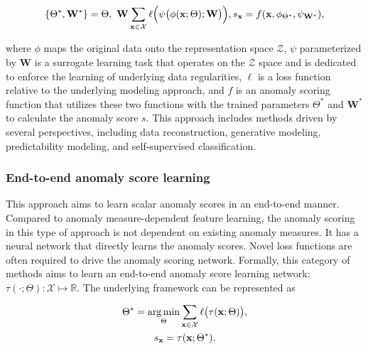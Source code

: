 \begin{equation}
\{\Theta^*, \mathbf{W}^*\} = {\Theta,\ \mathbf{W}} \sum_{\xvec \in \mathcal{X}}\ell\Big(\psi\big(\phi(\mathbf{x};\Theta);\mathbf{W}\big)\Big),
s_{\mathbf{x}} = f(\mathbf{x}, \phi_{\Theta^*}, \psi_{\mathbf{W}^*}) \label{eqn:genericfeature2},
\end{equation}

where $\phi$ maps the original data onto the representation space $\mathcal{Z}$, $\psi$ parameterized by $\mathbf{W}$ is a surrogate learning task that operates on the $\mathcal{Z}$ space and is dedicated to enforce the learning of underlying data regularities, $\ell$ is a loss function relative to the underlying modeling approach, and $f$ is an anomaly scoring function that utilizes these two functions with the trained parameters $\Theta^*$ and $\mathbf{W}^*$ to calculate the anomaly score $s$. This approach includes methods driven by several perspectives, including data reconstruction, generative modeling, predictability modeling, and self-supervised classification.

\subsubsection{End-to-end anomaly score learning}
\label{ch:background:sec:anomalydetection:subsec:deepanomaly:subsubsec:anomalyscore}
This approach aims to learn scalar anomaly scores in an end-to-end manner. Compared to anomaly measure-dependent feature learning, the anomaly scoring in this type of approach is not dependent on existing anomaly measures. It has a neural network that directly learns the anomaly scores. Novel loss functions are often required to drive the anomaly scoring network. Formally, this category of methods aims to learn an end-to-end anomaly score learning network: $\tau(\cdot; \Theta):\mathcal{X} \mapsto \mathbb{R}$. The underlying framework can be represented as

\begin{gather}\label{eqn:scorelearning1}
    \Theta^* = \operatorname*{arg\,min}_{\Theta} \sum_{{\mathbf{x}} \in \mathcal{X}} \ell\big( \tau(\mathbf{x};\Theta) \big),\\
    s_{{\mathbf{x}}} = \tau(\mathbf{x};\Theta^*)\label{eqn:scorelearning2}.
\end{gather}


